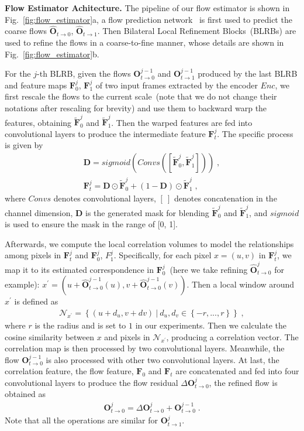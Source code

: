 \documentclass[10pt,twocolumn,letterpaper]{article}
\begin{document}
	
	\noindent\textbf{Flow Estimator Achitecture.} The pipeline of our flow estimator is shown in Fig.~\ref{fig:flow_estimator}a, a flow prediction network~\cite{rife} is first used to predict the coarse flows $\hat{\bm{O}}_{t\rightarrow0}$, $\hat{\bm{O}}_{t\rightarrow1}$. Then Bilateral Local Refinement Blocks~(BLRBs) are used to refine the flows in a coarse-to-fine manner, whose details are shown in Fig.~\ref{fig:flow_estimator}b.
	
	For the $j$-th BLRB, given the flows $\bm{O}^{j-1}_{t\rightarrow0}$ and $\bm{O}^{j-1}_{t\rightarrow1}$ produced by the last BLRB and feature maps $\bm{F}_0^{j}$, $\bm{F}_1^{j}$ of two input frames extracted by the encoder $Enc$, we first rescale the flows to the current scale~(note that we do not change their notations after rescaling for brevity) and use them to backward warp the features, obtaining $\widetilde{\bm{F}}_0^{j}$ and $\widetilde{\bm{F}}_1^{j}$. Then the warped features are fed into convolutional layers to produce the intermediate feature $\bm{F}_t^{j}$. The specific process is given by
	\begin{align}\label{eq:flow}
	\bm{D}=sigmoid(Convs([\widetilde{\bm{F}}_0^{j}, \widetilde{\bm{F}}_1^{j}])) \;, \\
	\bm{F}_t^{j} = \bm{D} \odot \widetilde{\bm{F}}_0^{j}+(1-\bm{D}) \odot \widetilde{\bm{F}}_1^{j} \;,
	\end{align}
	where $Convs$ denotes convolutional layers, $[~]$ denotes concatenation in the channel dimension, $\bm{D}$ is the generated mask for blending $\widetilde{\bm{F}}_0^{j}$ and $\widetilde{\bm{F}}_1^{j}$, and $sigmoid$ is used to ensure the mask in the range of [0, 1].
	
	Afterwards, we compute the local correlation volumes to model the relationships among pixels in $\bm{F}_t^{j}$ and $\bm{F}_0^{j}$, $F_1^{j}$. Specifically, for each pixel $x=(u,v)$ in $\bm{F}_t^{j}$, we map it to its estimated correspondence in $\bm{F}_0^{j}$~(here we take refining $\hat{\bm{O}}^{j}_{t\rightarrow0}$ for example): $x^{'}=(u+\hat{\bm{O}}^{j-1}_{t\rightarrow0}(u), v+\hat{\bm{O}}^{j-1}_{t\rightarrow0}(v))$. Then a local window around $x^{'}$ is defined as
	\begin{align}
	\mathcal{N}_{x^{'}} = \left \{ (u+d_u, v+dv)~|~d_u,d_v\in \left \{ -r,...,r \right \} \right \} \;,
	\end{align} 
	where $r$ is the radius and is set to $1$ in our experiments. Then we calculate the cosine similarity between $x$ and pixels in $\mathcal{N}_{x^{'}}$, producing a correlation vector.
	The correlation map is then processed by two convolutional layers. Meanwhile, the flow $\bm{O}^{j-1}_{t\rightarrow0}$ is also processed with other two convolutional layers. At last, the correlation feature, the flow feature, $\bm{F}_0$ and $\bm{F}_t$ are concatenated and fed into four convolutional layers to produce the flow residual $\Delta \bm{O}^{j}_{t\rightarrow0}$, the refined flow is obtained as
	\begin{align}
	\bm{O}^{j}_{t\rightarrow0} = \Delta \bm{O}^{j}_{t\rightarrow0} + \bm{O}^{j-1}_{t\rightarrow0} \;.
	\end{align} 
	Note that all the operations are similar for $\bm{O}^{j}_{t\rightarrow1}$. 
	
\end{document}
